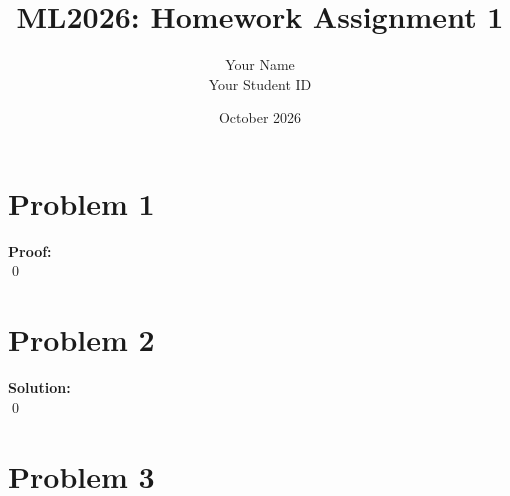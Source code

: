 \documentclass[12pt, a4paper,oneside, UTF8]{article}
\title{ML2026: Homework Assignment 1}
\author{
Your Name\\
Your Student ID
}
\date{October 2026}
\renewenvironment{proof}{\textbf{Proof:}\\}{\qed\par}
\newenvironment{solution}{\textbf{Solution:}\\}{\qed\par}
\begin{document}
\maketitle

\section{Problem 1}
\begin{proof}
    
\end{proof}



\section{Problem 2}
\begin{solution}
    
\end{solution}



\section{Problem 3}
\end{document}
